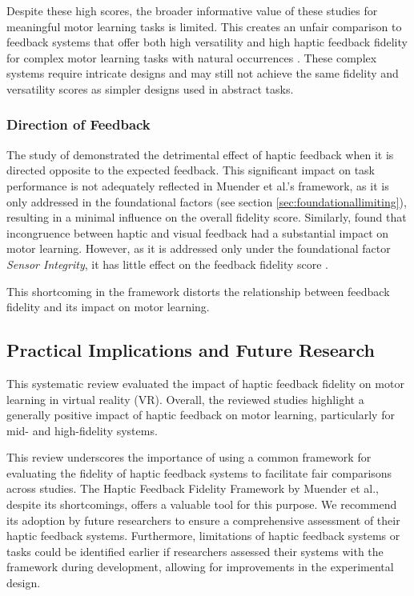 Despite these high scores, the broader informative value of these studies for meaningful motor learning tasks is limited. This creates an unfair comparison to feedback systems that offer both high versatility and high haptic feedback fidelity for complex motor learning tasks with natural occurrences \cite{LeeY2019, LiuH2019, Oezen2022}. These complex systems require intricate designs and may still not achieve the same fidelity and versatility scores as simpler designs used in abstract tasks.


\subsubsection{Direction of Feedback}
The study of \cite{Macuga2019} demonstrated the detrimental effect of haptic feedback when it is directed opposite to the expected feedback. This significant impact on task performance is not adequately reflected in Muender et al.'s framework, as it is only addressed in the foundational factors (see section \ref{sec:foundationallimiting}), resulting in a minimal influence on the overall fidelity score. Similarly, \cite{Mohanty2023} found that incongruence between haptic and visual feedback had a substantial impact on motor learning. However, as it is addressed only under the foundational factor \textit{Sensor Integrity}, it has little effect on the feedback fidelity score \cite{Muender2022HapticReality}.

This shortcoming in the framework distorts the relationship between feedback fidelity and its impact on motor learning.

\subsection{Practical Implications and Future Research}
This systematic review evaluated the impact of haptic feedback fidelity on motor learning in virtual reality (VR). Overall, the reviewed studies highlight a generally positive impact of haptic feedback on motor learning, particularly for mid- and high-fidelity systems.

This review underscores the importance of using a common framework for evaluating the fidelity of haptic feedback systems to facilitate fair comparisons across studies. The Haptic Feedback Fidelity Framework by Muender et al., despite its shortcomings, offers a valuable tool for this purpose. We recommend its adoption by future researchers to ensure a comprehensive assessment of their haptic feedback systems. Furthermore, limitations of haptic feedback systems or tasks could be identified earlier if researchers assessed their systems with the framework during development, allowing for improvements in the experimental design.

